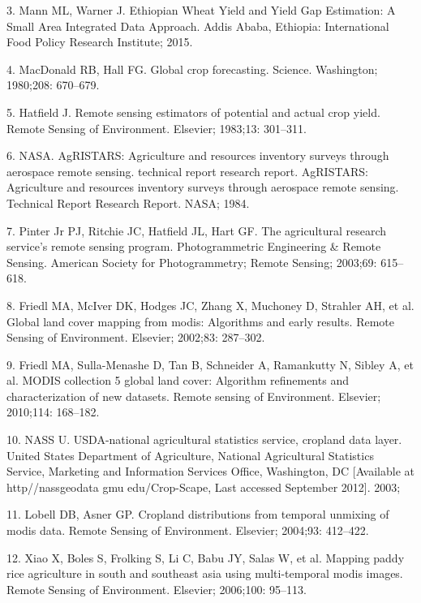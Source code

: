 \documentclass[10pt,letterpaper]{article}
\begin{document}
\hypertarget{ref-Mann2015}{}
3. Mann ML, Warner J. Ethiopian Wheat Yield and Yield Gap Estimation: A
Small Area Integrated Data Approach. Addis Ababa, Ethiopia:
International Food Policy Research Institute; 2015.

\hypertarget{ref-macdonald1980global}{}
4. MacDonald RB, Hall FG. Global crop forecasting. Science. Washington;
1980;208: 670--679.

\hypertarget{ref-hatfield1983remote}{}
5. Hatfield J. Remote sensing estimators of potential and actual crop
yield. Remote Sensing of Environment. Elsevier; 1983;13: 301--311.

\hypertarget{ref-NASA1984}{}
6. NASA. AgRISTARS: Agriculture and resources inventory surveys through
aerospace remote sensing. technical report research report. AgRISTARS:
Agriculture and resources inventory surveys through aerospace remote
sensing. Technical Report Research Report. NASA; 1984.

\hypertarget{ref-pinter2003agricultural}{}
7. Pinter Jr PJ, Ritchie JC, Hatfield JL, Hart GF. The agricultural
research service's remote sensing program. Photogrammetric Engineering
\& Remote Sensing. American Society for Photogrammetry; Remote Sensing;
2003;69: 615--618.

\hypertarget{ref-friedl2002global}{}
8. Friedl MA, McIver DK, Hodges JC, Zhang X, Muchoney D, Strahler AH, et
al. Global land cover mapping from modis: Algorithms and early results.
Remote Sensing of Environment. Elsevier; 2002;83: 287--302.

\hypertarget{ref-friedl2010modis}{}
9. Friedl MA, Sulla-Menashe D, Tan B, Schneider A, Ramankutty N, Sibley
A, et al. MODIS collection 5 global land cover: Algorithm refinements
and characterization of new datasets. Remote sensing of Environment.
Elsevier; 2010;114: 168--182.

\hypertarget{ref-nass2003usda}{}
10. NASS U. USDA-national agricultural statistics service, cropland data
layer. United States Department of Agriculture, National Agricultural
Statistics Service, Marketing and Information Services Office,
Washington, DC {[}Available at http//nassgeodata gmu edu/Crop-Scape,
Last accessed September 2012{]}. 2003;

\hypertarget{ref-lobell2004cropland}{}
11. Lobell DB, Asner GP. Cropland distributions from temporal unmixing
of modis data. Remote Sensing of Environment. Elsevier; 2004;93:
412--422.

\hypertarget{ref-xiao2006mapping}{}
12. Xiao X, Boles S, Frolking S, Li C, Babu JY, Salas W, et al. Mapping
paddy rice agriculture in south and southeast asia using multi-temporal
modis images. Remote Sensing of Environment. Elsevier; 2006;100:
95--113.
\end{document}

